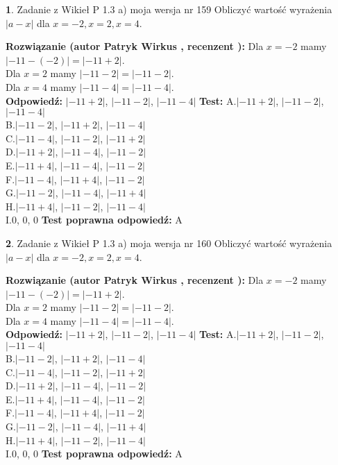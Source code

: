 \documentclass[12pt, a4paper]{article}
\theoremstyle{definition} %
\newtheorem{zad}{}
\newcommand{\zadStart}[1]{\begin{zad}#1\newline}
\newcommand{\zadStop}{\end{zad}}
\newcommand{\rozwStart}[2]{\noindent \textbf{Rozwiązanie (autor #1 , recenzent #2): }\newline}
\newcommand{\rozwStop}{\newline}
\newcommand{\odpStart}{\noindent \textbf{Odpowiedź:}\newline}
\newcommand{\odpStop}{\newline}
\newcommand{\testStart}{\noindent \textbf{Test:}\newline}
\newcommand{\testStop}{\newline}
\newcommand{\kluczStart}{\noindent \textbf{Test poprawna odpowiedź:}\newline}
\newcommand{\kluczStop}{\newline}
\begin{document}
\zadStart{Zadanie z Wikieł P 1.3 a) moja wersja nr 159}
Obliczyć wartość wyrażenia $|a - x|$ dla $x=-2,x=2,x=4$.
\zadStop
\rozwStart{Patryk Wirkus}{}
Dla $x = -2$ mamy $|-11 - (-2)| = |-11 + 2|$.\\
Dla $x = 2$ mamy $|-11 - 2| = |-11 - 2|$.\\
Dla $x = 4$ mamy $|-11 - 4| = |-11 - 4|$.\\
\rozwStop
\odpStart
$|-11 + 2|$, $|-11 - 2|$, $|-11 - 4|$
\odpStop
\testStart
A.$|-11 + 2|$, $|-11 - 2|$, $|-11 - 4|$\\
B.$|-11 - 2|$, $|-11 + 2|$, $|-11 - 4|$\\
C.$|-11 - 4|$, $|-11 - 2|$, $|-11 + 2|$\\
D.$|-11 + 2|$, $|-11 - 4|$, $|-11 - 2|$\\
E.$|-11 + 4|$, $|-11 - 4|$, $|-11 - 2|$\\
F.$|-11 - 4|$, $|-11 + 4|$, $|-11 - 2|$\\
G.$|-11 - 2|$, $|-11 - 4|$, $|-11 + 4|$\\
H.$|-11 + 4|$, $|-11 - 2|$, $|-11 - 4|$\\
I.$0$, $0$, $0$
\testStop
\kluczStart
A
\kluczStop



\zadStart{Zadanie z Wikieł P 1.3 a) moja wersja nr 160}
Obliczyć wartość wyrażenia $|a - x|$ dla $x=-2,x=2,x=4$.
\zadStop
\rozwStart{Patryk Wirkus}{}
Dla $x = -2$ mamy $|-11 - (-2)| = |-11 + 2|$.\\
Dla $x = 2$ mamy $|-11 - 2| = |-11 - 2|$.\\
Dla $x = 4$ mamy $|-11 - 4| = |-11 - 4|$.\\
\rozwStop
\odpStart
$|-11 + 2|$, $|-11 - 2|$, $|-11 - 4|$
\odpStop
\testStart
A.$|-11 + 2|$, $|-11 - 2|$, $|-11 - 4|$\\
B.$|-11 - 2|$, $|-11 + 2|$, $|-11 - 4|$\\
C.$|-11 - 4|$, $|-11 - 2|$, $|-11 + 2|$\\
D.$|-11 + 2|$, $|-11 - 4|$, $|-11 - 2|$\\
E.$|-11 + 4|$, $|-11 - 4|$, $|-11 - 2|$\\
F.$|-11 - 4|$, $|-11 + 4|$, $|-11 - 2|$\\
G.$|-11 - 2|$, $|-11 - 4|$, $|-11 + 4|$\\
H.$|-11 + 4|$, $|-11 - 2|$, $|-11 - 4|$\\
I.$0$, $0$, $0$
\testStop
\kluczStart
A
\kluczStop
\end{document}
